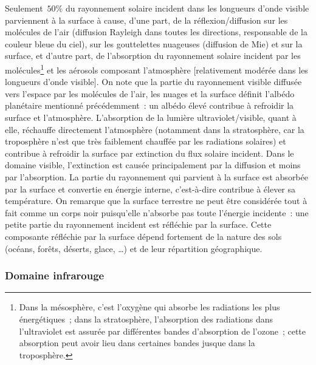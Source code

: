 \sk
Seulement~$50\%$ du rayonnement solaire incident dans les longueurs d'onde visible parviennent à la surface à cause, d'une part, de la réflexion/diffusion sur les molécules de l'air (diffusion Rayleigh dans toutes les directions, responsable de la couleur bleue du ciel), sur les gouttelettes nuageuses (diffusion de Mie) et sur la surface, et d'autre part, de l'absorption du rayonnement solaire incident par les molécules\footnote{Dans la mésosphère, c'est l'oxygène qui absorbe les radiations les plus énergétiques~; dans la stratosphère, l'absorption des radiations dans l’ultraviolet est assurée par différentes bandes d'absorption de l'ozone~; cette absorption peut avoir lieu dans certaines bandes jusque dans la troposphère.} et les aérosols composant l'atmosphère [relativement modérée dans les longueurs d'onde visible]. On note que la partie du rayonnement visible diffusée vers l'espace par les molécules de l'air, les nuages et la surface définit l'albédo planétaire mentionné précédemment~: un albédo élevé contribue à refroidir la surface et l'atmosphère. L'absorption de la lumière ultraviolet/visible, quant à elle, réchauffe directement l'atmosphère (notamment dans la stratosphère, car la troposphère n'est que très faiblement chauffée par les radiations solaires) et contribue à refroidir la surface par extinction du flux solaire incident. Dans le domaine visible, l'extinction est causée principalement par la diffusion et moins par l'absorption. La partie du rayonnement qui parvient à la surface est absorbée par la surface et convertie en énergie interne, c'est-à-dire contribue à élever sa température. On remarque que la surface terrestre ne peut être considérée tout à fait comme un corps noir puisqu'elle n'absorbe pas toute l'énergie incidente~: une petite partie du rayonnement incident est réfléchie par la surface. Cette composante réfléchie par la surface dépend fortement de la nature des sols (océans, forêts, déserts, glace, \ldots) et de leur répartition géographique.

\sk
\subsubsection{Domaine infrarouge}

